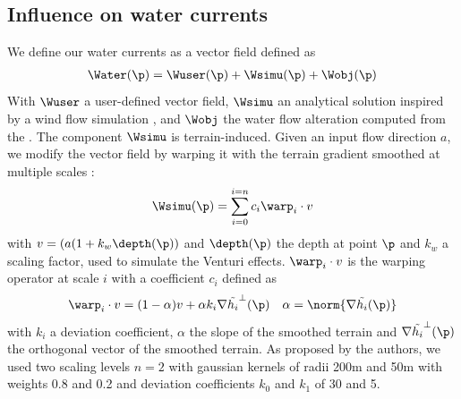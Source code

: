 \subsection{Influence on water currents}
\label{sec:semantic-representation_water-currents}
We define our water currents as a vector field defined as 
\begin{align*}
    \Water(\p) = \Wuser(\p) + \Wsimu(\p) + \Wobj(\p)
\end{align*}
With $\Wuser$ a user-defined vector field, $\Wsimu$ an analytical solution inspired by a wind flow simulation \cite{Paris2020}, and $\Wobj$ the water flow alteration computed from the . 
The component $\Wsimu$ is terrain-induced. Given an input flow direction $a$, we modify the vector field by warping it with the terrain gradient smoothed at multiple scales :
\begin{align*}
    \Wsimu(\p) = \sum_{i=0}^{i=n}{c_i \warp_i \cdot v}
\end{align*}
with $v = (a (1 + k_w \depth(\p))$ and $\depth(\p)$ the depth at point $\p$ and $k_w$ a scaling factor, used to simulate the Venturi effects. $\warp_i \cdot v$ is the warping operator at scale $i$ with a coefficient $c_i$ defined as 
\begin{align*}
& \warp_i \cdot v = (1 - \alpha) v + \alpha k_i \nabla \Tilde{h_i}^{\perp}(\p) & \alpha = \norm{ \nabla \Tilde{h_i}(\p) }
\end{align*}
with $k_i$ a deviation coefficient, $\alpha$ the slope of the smoothed terrain and $\nabla \Tilde{h_i}^{\perp}(\p)$ the orthogonal vector of the smoothed terrain. As proposed by the authors, we used two scaling levels $n = 2$ with gaussian kernels of radii \si{200}{m} and \si{50}{m} with weights 0.8 and 0.2 and deviation coefficients $k_0$ and $k_1$ of 30 and 5.

